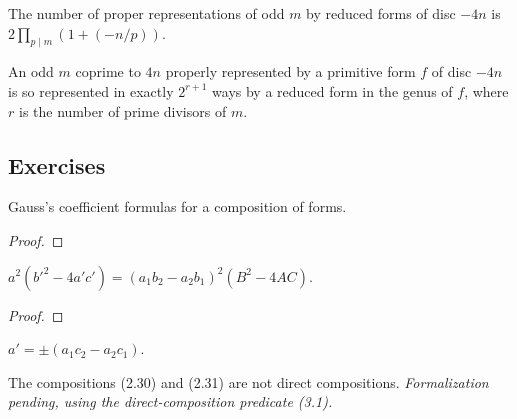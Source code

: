 \begin{lemma}
  \label{lem:l3_25}
  \leanok
  The number of proper representations of odd $m$ by reduced forms of disc $-4n$ is
  $2\prod_{p\mid m}(1+(-n/p))$.
\end{lemma}

\begin{theorem}
  \label{cor:c3_26}
  \leanok
  An odd $m$ coprime to $4n$ properly represented by a primitive form $f$ of disc
  $-4n$ is so represented in exactly $2^{r+1}$ ways by a reduced form in the genus
  of $f$, where $r$ is the number of prime divisors of $m$.
\end{theorem}

\subsection{Exercises}

\begin{theorem}[Exercise 3.1(a)]
  \label{exr:s3_1_a}
  \leanok
  Gauss's coefficient formulas for a composition of forms.
\end{theorem}
\begin{proof}\leanok\end{proof}

\begin{theorem}[Exercise 3.1(b)]
  \label{exr:s3_1_b}
  \leanok
  $a^2(b'^2-4a'c') = (a_1b_2-a_2b_1)^2(B^2-4AC)$.
\end{theorem}
\begin{proof}\leanok\end{proof}

\begin{theorem}[Exercise 3.1(c)]
  \label{exr:s3_1_c}
  \leanok
  $a' = \pm(a_1c_2-a_2c_1)$.
\end{theorem}

\begin{theorem}[Exercise 3.2]
  \label{exr:s3_2}
  \notready
  The compositions (2.30) and (2.31) are not direct compositions.
  \emph{Formalization pending, using the direct-composition predicate (3.1).}
\end{theorem}

